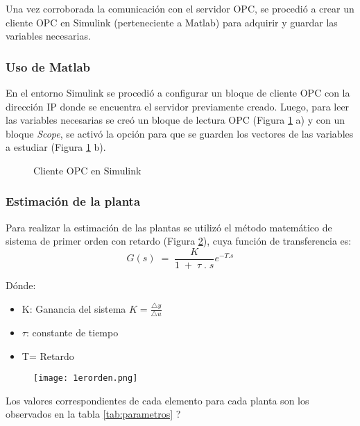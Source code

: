 Una vez corroborada la comunicación con el servidor OPC, se procedió a crear un cliente OPC en Simulink (perteneciente a Matlab) para adquirir y guardar las variables necesarias. 


\subsubsection{Uso de Matlab}
En el entorno Simulink se procedió a configurar un bloque de cliente OPC con la dirección IP donde se encuentra el servidor previamente creado. Luego, para leer las variables necesarias se creó un bloque de lectura OPC (Figura \ref{fig:opcsimu} a) y con un bloque \textit{Scope}, se activó la opción para que se guarden los vectores de las variables a estudiar (Figura \ref{fig:opcsimu} b). 


\begin{figure}[htbp]
	\centering
	\caption{Cliente OPC en Simulink} \label{fig:opcsimu}
\end{figure}



\subsubsection{Estimación de la planta}

Para realizar la estimación de las plantas se utilizó el método matemático de sistema de primer orden con retardo (Figura \ref{fig:1erorden}), cuya función de transferencia es: \\
\begin{equation}
	G(s)\;=\;\frac K{1\;+\;\tau\;.\;s}e^{-T.s}
\end{equation}


Dónde:
\begin{itemize}
	\item K:  Ganancia del sistema $K = \frac{\triangle y}{\triangle u}$
	\item $\tau$: constante de tiempo
	\item T= Retardo
\end{itemize}

\begin{figure}[htb]
	\centering
	\texttt{[image: 1erorden.png]}
	\label{fig:1erorden}
\end{figure}
Los valores correspondientes de cada elemento para cada planta son los observados en la tabla \ref{tab:parametros} 
?\\



